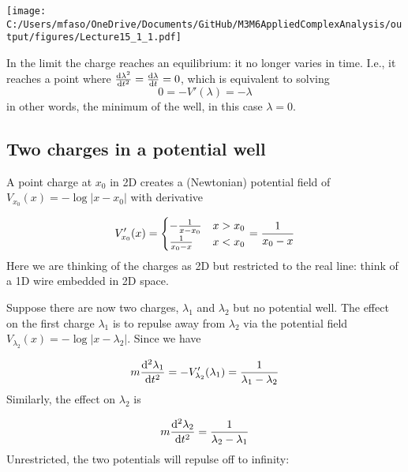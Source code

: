 \documentclass[12pt,landscape]{article}
\def\D{ {\rm d} }
\def\dt{\D t}
\def\cent#1{\begin{center}#1\end{center} }
\begin{document}
{\cent{\texttt{[image: C:/Users/mfaso/OneDrive/Documents/GitHub/M3M6AppliedComplexAnalysis/output/figures/Lecture15\_1\_1.pdf]}}
In the limit the charge reaches an equilibrium: it no longer varies in time. I.e., it reaches a point where ${ \D \lambda^2 \over \dt^2} = { \D \lambda \over \dt}  = 0$, which is equivalent to solving
\[
 0 = - V'(\lambda)  = - \lambda
\]
in other words, the minimum of the well, in this case $\lambda = 0$.

\subsection{Two charges in a potential well}
A point charge at $x_0$ in 2D creates a (Newtonian) potential field of $V_{x_0}(x) = -\log|x - x_0|$ with derivative

\[
V_{x_0}'(x) = \begin{cases} -{1 \over x - x_0} & x > x_0 \\
        {1 \over x_0 - x} & x < x_0
\end{cases} = {1 \over x_0 - x}
\]
Here we are thinking of the charges as 2D but restricted to the real line: think of a 1D wire embedded in 2D space.

Suppose there are now two charges, $\lambda_1$ and $\lambda_2$ but no potential well.  The effect on the first charge $\lambda_1$ is to repulse away from $\lambda_2$ via the potential field $V_{\lambda_2}(x) = -\log|x - \lambda_2|$. Since we have

\[
m {\D^2 \lambda_1 \over \D t^2} = - V_{\lambda_2}'(\lambda_1) =  {1 \over \lambda_1 -\lambda_2}
\]
Similarly, the effect on $\lambda_2$ is

\[
m {\D^2 \lambda_2 \over \D t^2} = {1 \over \lambda_2 -\lambda_1}
\]
Unrestricted, the two potentials will repulse off to infinity:


}
\end{document}
